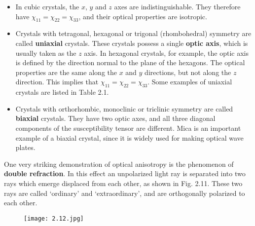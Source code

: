 \documentclass[12pt]{book}
\begin{document}
\begin{itemize}
  \item In cubic crystals, the $x$, $y$ and $z$ axes are indistinguishable. They therefore have $\chi_{11}=\chi_{22}=\chi_{33}$, and their optical properties are isotropic.
  \item Crystals with tetragonal, hexagonal or trigonal (rhombohedral) symmetry are called \textbf{uniaxial} crystals. These crystals possess a single \textbf{optic axis}, which is usually taken as the $z$ axis. In hexagonal crystals, for example, the optic axis is defined by the direction normal to the plane of the hexagons. The optical properties are the same along the $x$ and $y$ directions, but not along the $z$ direction. This implies that $\chi_{11}=\chi_{22}=\chi_{33}$. Some examples of uniaxial crystals are listed in Table 2.1.
  \item Crystals with orthorhombic, monoclinic or triclinic symmetry are called \textbf{biaxial} crystals. They have two optic axes, and all three diagonal components of the susceptibility tensor are different. Mica is an important example of a biaxial crystal, since it is widely used for making optical wave plates.
\end{itemize}

One very striking demonstration of optical anisotropy is the phenomenon of \textbf{double refraction}. In this effect an unpolarized light ray is separated into two rays which emerge displaced from each other, as shown in Fig. 2.11. These two rays are called `ordinary' and `extraordinary', and are orthogonally polarized to each other.

\begin{figure}
  \centering
  \texttt{[image: 2.12.jpg]}\\
  \label{fig:2.12}
\end{figure}
\end{document}
